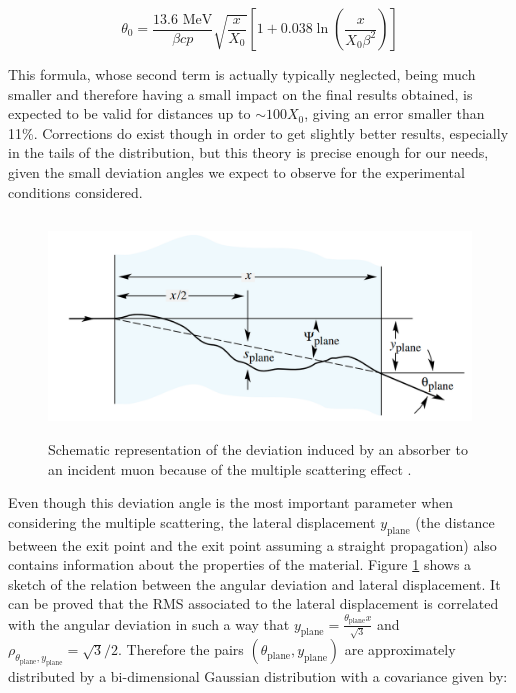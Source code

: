 \documentclass[a4paper, 11pt, twoside, openright]{report}
\begin{document}
\begin{equation}
\label{eq:Moliere}
\theta_0 = \frac{13.6 \text{ MeV}}{\beta c p} \sqrt{\frac{x}{X_0}} \left [1 + 0.038 \ln \left (\frac{x}{X_0 \beta^2} \right ) \right ]
\end{equation}

This formula, whose second term is actually typically neglected, being much smaller and therefore having a small impact on the final results obtained, is expected to be valid for distances up to $\sim 100 X_0$, giving an error smaller than 11\%. Corrections do exist though in order to get slightly better results, especially in the tails of the distribution, but this theory is precise enough for our needs, given the small deviation angles we expect to observe for the experimental conditions considered.

\begin{figure}[htbp]
\begin{center}
\includegraphics[width=12.5cm, height=5.8cm]{figs/moliere.png}
\caption{Schematic representation of the deviation induced by an absorber to an incident muon because of the multiple scattering effect \cite{PDGScat}.}
\label{figure:Moliere}
\end{center}
\end{figure}

Even though this deviation angle is the most important parameter when considering the multiple scattering, the lateral displacement $y_\text{plane}$ (the distance between the exit point and the exit point assuming a straight propagation) also contains information about the properties of the material. Figure \ref{figure:Moliere} shows a sketch of the relation between the angular deviation and lateral displacement. It can be proved that the RMS associated to the lateral displacement is correlated with the angular deviation in such a way that $y_\text{plane}=\frac{\theta_\text{plane}x}{\sqrt{3}}$ and $\rho_{\theta_\text{plane}, y_\text{plane}}=\sqrt{3}/2$. Therefore the pairs $(\theta_\text{plane}, y_\text{plane})$ are approximately distributed by a bi-dimensional Gaussian distribution with a covariance given by:
\end{document}
